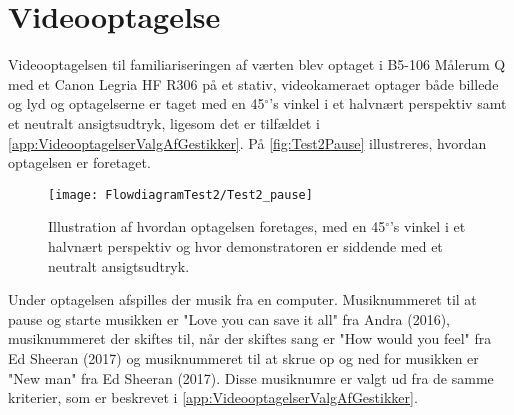 \chapter{Videooptagelse}
\label{app:VideooptagelseSocialAccept}
%
Videooptagelsen til familiariseringen af værten blev optaget i B5-106 Målerum Q med et Canon Legria HF R306 på et stativ, videokameraet optager både billede og lyd og optagelserne er taget med en 45$^\circ$'s vinkel i et halvnært perspektiv samt et neutralt ansigtsudtryk, ligesom det er tilfældet i \autoref{app:VideooptagelserValgAfGestikker}. På \autoref{fig:Test2Pause} illustreres, hvordan optagelsen er foretaget. 
%
\begin{figure}[H]
	\centering
	\texttt{[image: FlowdiagramTest2/Test2\_pause]}
	\caption{Illustration af hvordan optagelsen foretages, med en 45$^\circ$'s vinkel i et halvnært perspektiv og hvor demonstratoren er siddende med et neutralt ansigtsudtryk.}
	\label{fig:Test2Pause}
\end{figure}
\noindent
%
Under optagelsen afspilles der musik fra en computer. Musiknummeret til at pause og starte musikken er "Love you can save it all" fra Andra (2016), musiknummeret der skiftes til, når der skiftes sang er "How would you feel" fra Ed Sheeran (2017) og musiknummeret til at skrue op og ned for musikken er "New man" fra Ed Sheeran (2017). Disse musiknumre er valgt ud fra de samme kriterier, som er beskrevet i \autoref{app:VideooptagelserValgAfGestikker}.

